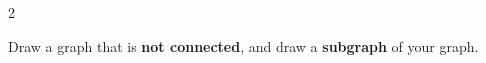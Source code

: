 \documentclass[a4paper,12pt]{book}
\newcounter{question}
\begin{document}
\begin{question}{\thequestion}{2}

    Draw a graph that is \textbf{not connected}, and draw a \textbf{subgraph} of your graph.


\end{question}
\end{document}

